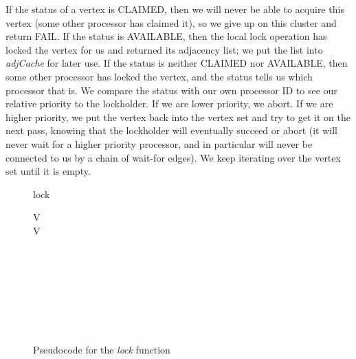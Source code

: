 \documentclass[10pt]{article}
\begin{document}
\begin{sloppypar}
If the status of a vertex is CLAIMED, then we will never be able to
acquire this vertex (some other processor has claimed it), so we give
up on this cluster and return FAIL.  If the status is AVAILABLE, then
the local lock operation has locked the vertex for us and returned its
adjacency list; we put the list into \emph{adjCache} for later use.
If the status is neither CLAIMED nor AVAILABLE, then some other
processor has locked the vertex, and the status tells us which
processor that is.  We compare the status with our own processor ID to
see our relative priority to the lockholder.  If we are lower
priority, we abort.  If we are higher priority, we put the vertex back
into the vertex set and try to get it on the next pass, knowing that
the lockholder will eventually succeed or abort (it will never wait
for a higher priority processor, and in particular will never be
connected to us by a chain of wait-for edges).  We keep iterating over
the vertex set until it is empty.

\begin{center}
\begin{figure}
\begin{algorithm}{lock}{}
\begin{WHILE}{V \neq \emptyset}
\\
V \leftarrow \emptyset \\
\begin{FOR}{}
 \\
\begin{FOR}{}
 \\
 \\
 \\
\end{FOR}
\end{FOR}
\end{WHILE}\\
\end{algorithm}
\caption{Pseudocode for the \emph{lock} function}
\label{figure:lock}
\end{figure}
\end{center}


\end{sloppypar}
\end{document}
